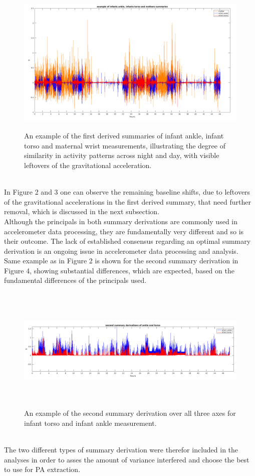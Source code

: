 \documentclass{article}
\begin{document}
{\begin{figure}[h!]
\includegraphics[width=15cm, height=7cm]{exampleTorsoAnkle2.png}
\caption{An example of the first derived summaries of infant ankle, infant torso and maternal wrist measurements, illustrating the degree of similarity in activity patterns across night and day, with visible leftovers of the gravitational acceleration.}
\end{figure}
\\
In Figure 2 and 3 one can observe the remaining baseline shifts, due to leftovers of the gravitational accelerations in the first derived summary, that need further removal, which is discussed in the next subsection. \\
Although the principals in both summary derivations are commonly used in accelerometer data processing, they are fundamentally very different and so is their outcome. The lack of established consensus regarding an optimal summary derivation is an ongoing issue in accelerometer data processing and analysis. Same example as in Figure 2 is shown for the second summary derivation in Figure 4, showing substantial differences, which are expected, based on the fundamental differences of the principals used.
\begin{figure}[h!]
\includegraphics[width=15cm, height=6cm]{bandpass_summary_example.png}
\caption{An example of the second summary derivation over all three axes for infant torso and infant ankle measurement.}
\end{figure}
\\
The two different types of summary derivation were therefor included in the analyses in order to asses the amount of variance interfered and choose the best to use for PA extraction.
\\
}
\end{document}
